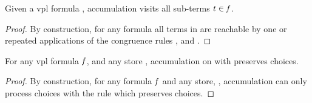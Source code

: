 \begin{lemma}
  \label{lemma:acc:all-terms}
  Given a \ac{vpl} formula \fV{}, accumulation visits all sub-terms $\mathit{t}{} \in
  \mathit{f}{}$.
\end{lemma}
%
\begin{proof}
  By construction, for any formula \fV{} all terms in \tV{} are reachable by one
  or repeated applications of the congruence rules \acOrV{}, \acAndV{} and
  \acNotV{}.
\end{proof}

\begin{lemma}
  \label{lemma:acc:preserving:choices}
  For any \ac{vpl} formula $\mathit{f}$, and any store \aStore{}, accumulation on
  \fV{} with \aStore{} preserves choices.
\end{lemma}
%
\begin{proof}
  By construction, for any formula $\mathit{f}$ and any store, \aStore{},
  accumulation can only process choices with the \acChc{} rule which preserves
  choices.
\end{proof}

